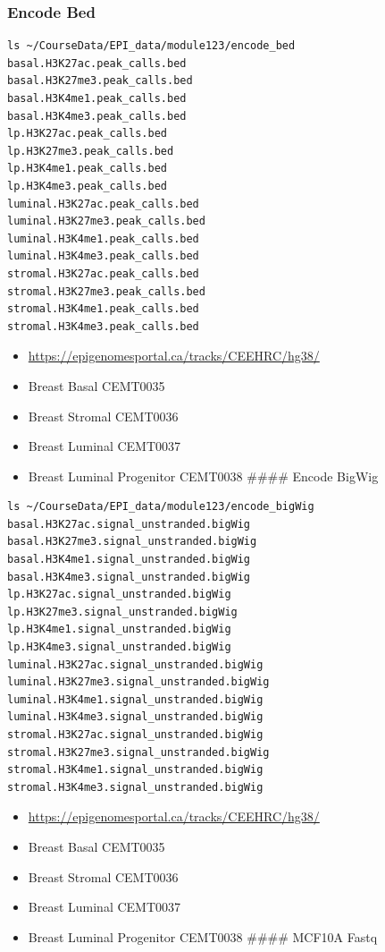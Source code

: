 \documentclass[
]{book}
\providecommand{\tightlist}{%
  \setlength{\itemsep}{0pt}\setlength{\parskip}{0pt}}
\begin{document}
\subsubsection{Encode Bed}\label{encode-bed}

\begin{verbatim}
ls ~/CourseData/EPI_data/module123/encode_bed
basal.H3K27ac.peak_calls.bed
basal.H3K27me3.peak_calls.bed
basal.H3K4me1.peak_calls.bed
basal.H3K4me3.peak_calls.bed
lp.H3K27ac.peak_calls.bed
lp.H3K27me3.peak_calls.bed
lp.H3K4me1.peak_calls.bed
lp.H3K4me3.peak_calls.bed
luminal.H3K27ac.peak_calls.bed
luminal.H3K27me3.peak_calls.bed
luminal.H3K4me1.peak_calls.bed
luminal.H3K4me3.peak_calls.bed
stromal.H3K27ac.peak_calls.bed
stromal.H3K27me3.peak_calls.bed
stromal.H3K4me1.peak_calls.bed
stromal.H3K4me3.peak_calls.bed
\end{verbatim}

\begin{itemize}
\tightlist
\item
  \url{https://epigenomesportal.ca/tracks/CEEHRC/hg38/}
\item
  Breast Basal CEMT0035
\item
  Breast Stromal CEMT0036
\item
  Breast Luminal CEMT0037
\item
  Breast Luminal Progenitor CEMT0038
  \#\#\#\# Encode BigWig
\end{itemize}

\begin{verbatim}
ls ~/CourseData/EPI_data/module123/encode_bigWig
basal.H3K27ac.signal_unstranded.bigWig
basal.H3K27me3.signal_unstranded.bigWig
basal.H3K4me1.signal_unstranded.bigWig
basal.H3K4me3.signal_unstranded.bigWig
lp.H3K27ac.signal_unstranded.bigWig
lp.H3K27me3.signal_unstranded.bigWig
lp.H3K4me1.signal_unstranded.bigWig
lp.H3K4me3.signal_unstranded.bigWig
luminal.H3K27ac.signal_unstranded.bigWig
luminal.H3K27me3.signal_unstranded.bigWig
luminal.H3K4me1.signal_unstranded.bigWig
luminal.H3K4me3.signal_unstranded.bigWig
stromal.H3K27ac.signal_unstranded.bigWig
stromal.H3K27me3.signal_unstranded.bigWig
stromal.H3K4me1.signal_unstranded.bigWig
stromal.H3K4me3.signal_unstranded.bigWig
\end{verbatim}

\begin{itemize}
\tightlist
\item
  \url{https://epigenomesportal.ca/tracks/CEEHRC/hg38/}
\item
  Breast Basal CEMT0035
\item
  Breast Stromal CEMT0036
\item
  Breast Luminal CEMT0037
\item
  Breast Luminal Progenitor CEMT0038
  \#\#\#\# MCF10A Fastq
\end{itemize}
\end{document}
